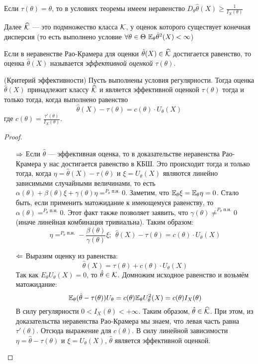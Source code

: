 \begin{corollary}
	Если $\tau(\theta) = \theta$, то в условиях теоремы имеем неравенство $D_\theta \hat{\theta}(X) \ge \frac{1}{I_X(\theta)}$
\end{corollary}

\begin{anote}
	Далее $\widehat{\mathcal{K}}$ --- это подмножество класса $\mathcal{K}$, у оценок которого существует конечная дисперсия (то есть выполнено условие $\forall \theta \in \Theta\ \mathbb{E}_\theta \hat{\theta}^2(X) < \infty$)
\end{anote}

\begin{definition}
	Если в неравенстве Рао-Крамера для оценки $\hat{\theta}(X) \in \widehat{\mathcal{K}}$ достигается равенство, то оценка $\hat{\theta}(X)$ называется \textit{эффективной оценкой $\tau(\theta)$}.
\end{definition}

\begin{theorem} (Критерий эффективности)
	Пусть выполнены условия регулярности. Тогда оценка $\hat{\theta}(X)$ принадлежит классу $\widehat{\mathcal{K}}$ и является эффективной оценкой $\tau(\theta)$ тогда и только тогда, когда выполнено равенство
	\[
		\hat{\theta}(X) - \tau(\theta) = c(\theta) \cdot U_\theta(X)
	\]
	где $c(\theta) = \frac{\tau'(\theta)}{I_X(\theta)}$.
\end{theorem}

\begin{proof}~
	\begin{itemize}
		\item[$\Rightarrow$] Если $\hat{\theta}$ --- эффективная оценка, то в доказательстве неравенства Рао-Крамера у нас достигается равенство в КБШ. Это происходит тогда и только тогда, когда $\eta = \hat{\theta}(X) - \tau(\theta)$ и $\xi = U_\theta(X)$ являются линейно зависимыми случайными величинами, то есть $\alpha(\theta) + \beta(\theta)\xi + \gamma(\theta)\eta =^{P_\theta\text{ п.н.}} 0$. Заметим, что $\mathbb{E}_\theta \xi = \mathbb{E}_\theta \eta = 0$. Стало быть, если применить матожидание к имеющемуся равенству, то $\alpha(\theta) =^{P_\theta\text{ п.н.}} 0$. Этот факт также позволяет заявить, что $\gamma(\theta) \neq^{P_\theta\text{ п.н.}} 0$ (иначе линейная комбинация тривиальна). Таким образом:
		\[
			\eta =^{P_\theta\text{ п.н.}} -\frac{\beta(\theta)}{\gamma(\theta)}\xi;\ \ \hat{\theta}(X) - \tau(\theta) = c(\theta) \cdot U_\theta(X)
		\]
		
		\item[$\Leftarrow$] Выразим оценку из равенства:
		\[
			\hat{\theta}(X) = \tau(\theta) + c(\theta) \cdot U_\theta(X)
		\]
		Так как $E_\theta U_\theta(X) = 0$, то $\hat{\theta} \in \mathcal{K}$. Домножим исходное равенство и возьмём матожидание:
		\[
			\mathbb{E}_\theta (\hat{\theta} - \tau(\theta))U_\theta = c(\theta) \mathbb{E}_\theta U_\theta^2(X) = c(\theta) I_X(\theta)
		\]
		В силу регулярности $0 < I_X(\theta) < +\infty$. Таким образом, $\hat{\theta} \in \widehat{\mathcal{K}}$. При этом, из доказательства неравенства Рао-Крамера мы знаем, что левая часть равна $\tau'(\theta)$. Отсюда выражение для $c(\theta)$. В силу линейной зависимости $\eta = \hat{\theta} - \tau(\theta)$ и $\xi = U_\theta(X)$, $\hat{\theta}$ является эффективной оценкой.
	\end{itemize}
\end{proof}

